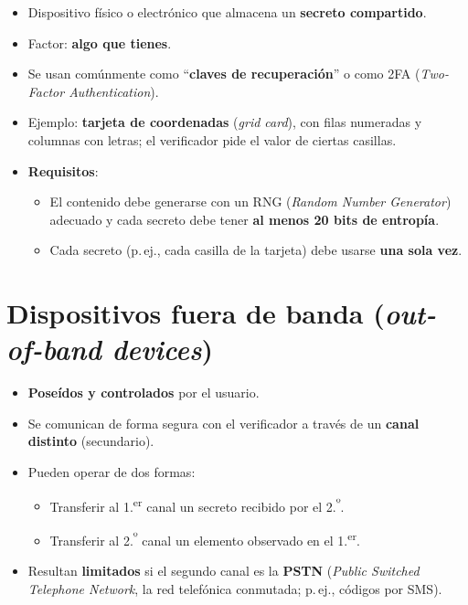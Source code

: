 \documentclass[11pt,a4paper]{report}
\begin{document}
\begin{itemize}
  \item Dispositivo físico o electrónico que almacena un \textbf{secreto compartido}.
  \item Factor: \textbf{algo que tienes}.
  \item Se usan comúnmente como ``\textbf{claves de recuperación}'' o como 2FA (\emph{Two-Factor Authentication}).
  \item Ejemplo: \textbf{tarjeta de coordenadas} (\emph{grid card}), con filas numeradas y columnas con letras; el verificador pide el valor de ciertas casillas.
  \item \textbf{Requisitos}:
    \begin{itemize}
      \item El contenido debe generarse con un RNG (\emph{Random Number Generator}) adecuado y cada secreto debe tener \textbf{al menos 20 bits de entropía}.
      \item Cada secreto (p.\,ej., cada casilla de la tarjeta) debe usarse \textbf{una sola vez}.
    \end{itemize}
\end{itemize}
 
\section{Dispositivos fuera de banda (\emph{out-of-band devices})}
 
\begin{itemize}
  \item \textbf{Poseídos y controlados} por el usuario.
  \item Se comunican de forma segura con el verificador a través de un \textbf{canal distinto} (secundario).
  \item Pueden operar de dos formas:
    \begin{itemize}
      \item Transferir al 1.\textsuperscript{er} canal un secreto recibido por el 2.\textsuperscript{º}.
      \item Transferir al 2.\textsuperscript{º} canal un elemento observado en el 1.\textsuperscript{er}.
    \end{itemize}
  \item Resultan \textbf{limitados} si el segundo canal es la \textbf{PSTN} (\emph{Public Switched Telephone Network}, la red telefónica conmutada; p.\,ej., códigos por SMS).
\end{itemize}
 
\end{document}
